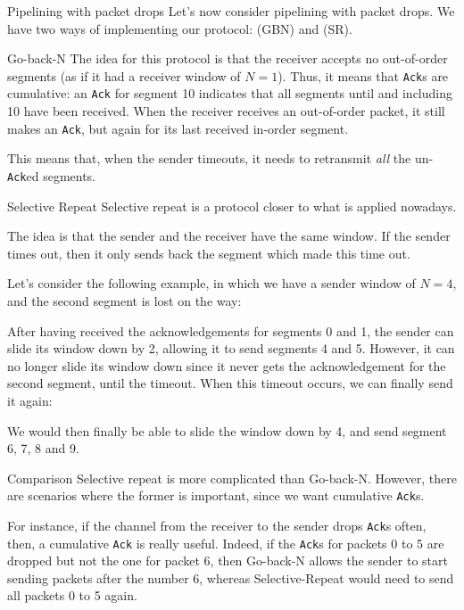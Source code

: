 \documentclass[a4paper]{article}
\begin{document}
\begin{parag}{Pipelining with packet drops}
    Let's now consider pipelining with packet drops. We have two ways of implementing our protocol:  (GBN) and  (SR).

    \begin{subparag}{Go-back-N}
        The idea for this protocol is that the receiver accepts no out-of-order segments (as if it had a receiver window of $N=1$). Thus, it means that \texttt{Ack}s are cumulative: an \texttt{Ack} for segment 10 indicates that all segments until and including 10 have been received. When the receiver receives an out-of-order packet, it still makes an \texttt{Ack}, but again for its last received in-order segment.

        This means that, when the sender timeouts, it needs to retransmit \textit{all} the un-\texttt{Ack}ed segments.
    \end{subparag}
    
    \begin{subparag}{Selective Repeat}
        Selective repeat is a protocol closer to what is applied nowadays.

        The idea is that the sender and the receiver have the same window. If the sender times out, then it only sends back the segment which made this time out. 

        Let's consider the following example, in which we have a sender window of $N=4$, and the second segment is lost on the way:

        After having received the acknowledgements for segments 0 and 1, the sender can slide its window down by 2, allowing it to send segments 4 and 5. However, it can no longer slide its window down since it never gets the acknowledgement for the second segment, until the timeout. When this timeout occurs, we can finally send it again:

        We would then finally be able to slide the window down by 4, and send segment 6, 7, 8 and 9.
    \end{subparag}

    \begin{subparag}{Comparison}
        Selective repeat is more complicated than Go-back-N. However, there are scenarios where the former is important, since we want cumulative \texttt{Ack}s.

        For instance, if the channel from the receiver to the sender drops \texttt{Ack}s often, then, a cumulative \texttt{Ack} is really useful. Indeed, if the \texttt{Ack}s for packets 0 to 5 are dropped but not the one for packet 6, then Go-back-N allows the sender to start sending packets after the number 6, whereas Selective-Repeat would need to send all packets 0 to 5 again.
    \end{subparag}
\end{parag}
\end{document}
